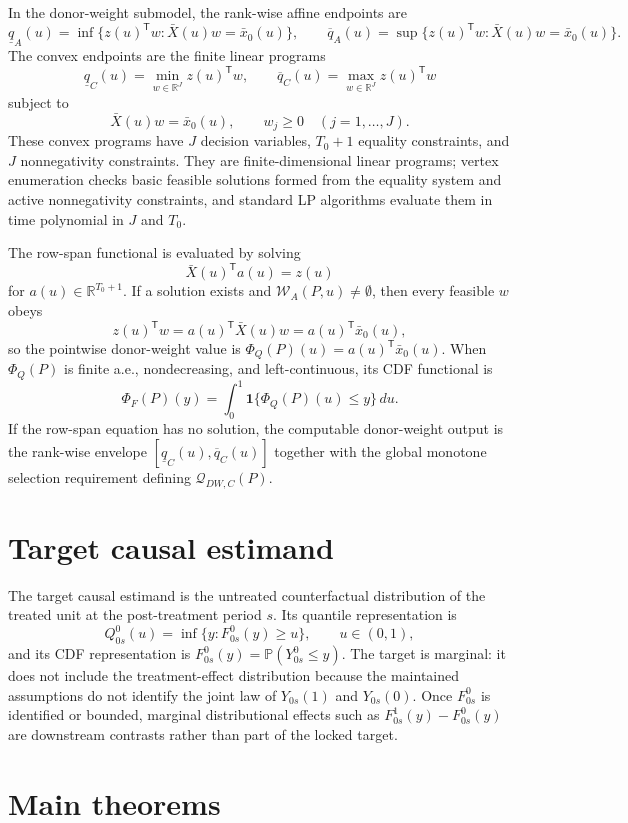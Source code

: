 \documentclass[11pt]{article}
\renewcommand{\Pr}{\mathbb{P}}
\newcommand{\one}{\mathbf{1}}
\newcommand{\transpose}{\mathsf{T}}
\newcommand{\R}{\mathbb{R}}
\theoremstyle{definition}
\theoremstyle{plain}
\theoremstyle{remark}
\begin{document}
In the donor-weight submodel, the rank-wise affine endpoints are
\[
\underline q_A(u)=\inf\{z(u)^\transpose w:\bar X(u)w=\bar x_0(u)\},\qquad
\overline q_A(u)=\sup\{z(u)^\transpose w:\bar X(u)w=\bar x_0(u)\}.
\]
The convex endpoints are the finite linear programs
\[
\underline q_C(u)=\min_{w\in\R^J}z(u)^\transpose w,
\qquad
\overline q_C(u)=\max_{w\in\R^J}z(u)^\transpose w
\]
subject to
\[
\bar X(u)w=\bar x_0(u),\qquad w_j\ge0\quad(j=1,\ldots,J).
\]
These convex programs have \(J\) decision variables, \(T_0+1\) equality constraints, and \(J\) nonnegativity constraints.  They are finite-dimensional linear programs; vertex enumeration checks basic feasible solutions formed from the equality system and active nonnegativity constraints, and standard LP algorithms evaluate them in time polynomial in \(J\) and \(T_0\).

The row-span functional is evaluated by solving
\[
\bar X(u)^\transpose a(u)=z(u)
\]
for \(a(u)\in\R^{T_0+1}\).  If a solution exists and \(\mathcal{W}_A(P,u)\ne\emptyset\), then every feasible \(w\) obeys
\[
z(u)^\transpose w=a(u)^\transpose\bar X(u)w=a(u)^\transpose\bar x_0(u),
\]
so the pointwise donor-weight value is \(\Phi_Q(P)(u)=a(u)^\transpose\bar x_0(u)\).  When \(\Phi_Q(P)\) is finite a.e., nondecreasing, and left-continuous, its CDF functional is
\[
\Phi_F(P)(y)=\int_0^1\one\{\Phi_Q(P)(u)\le y\}\,du.
\]
If the row-span equation has no solution, the computable donor-weight output is the rank-wise envelope \([\underline q_C(u),\overline q_C(u)]\) together with the global monotone selection requirement defining \(\mathcal{Q}_{DW,C}(P)\).

\section{Target causal estimand}
The target causal estimand is the untreated counterfactual distribution of the treated unit at the post-treatment period \(s\).  Its quantile representation is
\[
Q^0_{0s}(u)=\inf\{y:F^0_{0s}(y)\ge u\},\qquad u\in(0,1),
\]
and its CDF representation is \(F^0_{0s}(y)=\Pr(Y^0_{0s}\le y)\).  The target is marginal: it does not include the treatment-effect distribution because the maintained assumptions do not identify the joint law of \(Y_{0s}(1)\) and \(Y_{0s}(0)\).  Once \(F^0_{0s}\) is identified or bounded, marginal distributional effects such as \(F^1_{0s}(y)-F^0_{0s}(y)\) are downstream contrasts rather than part of the locked target.

\section{Main theorems}
\end{document}
